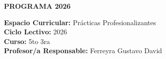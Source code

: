 \documentclass[11pt, a4paper]{article}
\begin{document}
\noindent\colorbox{schoolgreen}{\begin{minipage}{\dimexpr\textwidth-2\fboxsep}\centering \textbf{\fontsize{14}{16}\selectfont PROGRAMA 2026}\end{minipage}}

\vspace{1em}

\begin{flushleft}
\textbf{Espacio Curricular:} Prácticas Profesionalizantes \\
\textbf{Ciclo Lectivo:} 2026 \\
\textbf{Curso:} 5to 3ra \\
\textbf{Profesor/a Responsable:} Ferreyra Gustavo David
\end{flushleft}

\vspace{1em}
\end{document}
